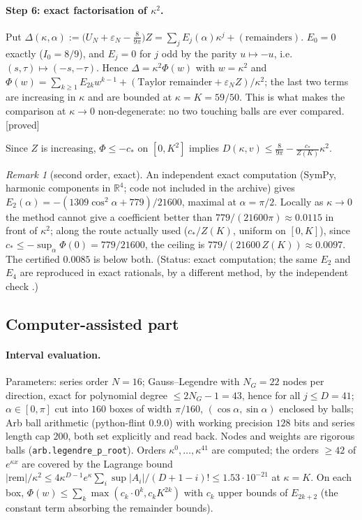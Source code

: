 \documentclass[11pt,a4paper]{article}
\theoremstyle{remark}
\newtheorem{remark}[theorem]{Remark}
\theoremstyle{definition}
\newcommand{\R}{\mathbb{R}}
\newcommand{\st}[1]{\textsf{[#1]}}
\begin{document}
\paragraph{Step 6: exact factorisation of $\kappa^2$.} Put
$\Delta(\kappa,\alpha):=\big(U_N+\varepsilon_N-\tfrac{8}{9\pi}\big)Z=\sum_jE_j(\alpha)\kappa^j+(\text{remainders})$.
$E_0=0$ exactly ($I_0=8/9$), and $E_j=0$ for $j$ odd by the parity $u\mapsto-u$, i.e.\ $(s,\tau)\mapsto(-s,-\tau)$.
Hence $\Delta=\kappa^2\Phi(w)$ with $w=\kappa^2$ and
$\Phi(w)=\sum_{k\ge1}E_{2k}w^{k-1}+(\text{Taylor remainder}+\varepsilon_NZ)/\kappa^2$; the last two terms
are increasing in $\kappa$ and are bounded at $\kappa=K=59/50$. This is what makes the comparison at
$\kappa\to0$ non-degenerate: no two touching balls are ever compared. \st{proved}

Since $Z$ is increasing, $\Phi\le-c_\ast$ on $[0,K^2]$ implies
$D(\kappa,v)\le\frac{8}{9\pi}-\frac{c_\ast}{Z(K)}\kappa^2$.

\begin{remark}[second order, exact]
An independent exact computation (SymPy, harmonic components in $\R^4$; code not included in the archive)
gives $E_2(\alpha)=-(1309\cos^2\alpha+779)/21600$, maximal at $\alpha=\pi/2$. Locally as $\kappa\to0$ the
method cannot give a coefficient better than $779/(21600\pi)\approx0.0115$ in front of $\kappa^2$; along the
route actually used ($c_\ast/Z(K)$, uniform on $[0,K]$), since $c_\ast\le-\sup_\alpha\Phi(0)=779/21600$, the
ceiling is $779/(21600\,Z(K))\approx0.0097$. The certified $0.0085$ is below both.
(Status: exact computation; the same $E_2$ and $E_4$ are reproduced in exact rationals, by a different method,
by the independent check .)
\end{remark}

\subsection{Computer-assisted part}\label{sec:cap}

\paragraph{Interval evaluation.} Parameters: series order $N=16$; Gauss--Legendre with $N_G=22$ nodes per
direction, exact for polynomial degree $\le2N_G-1=43$, hence for all $j\le D=41$; $\alpha\in[0,\pi]$ cut into
$160$ boxes of width $\pi/160$, $(\cos\alpha,\sin\alpha)$ enclosed by balls; Arb ball arithmetic
(python-flint 0.9.0) with working precision $128$ bits and series length cap $200$, both set explicitly and
read back. Nodes and weights are rigorous balls (\texttt{arb.legendre\_p\_root}). Orders $\kappa^0,\dots,\kappa^{41}$
are computed; the orders $\ge42$ of $e^{\kappa x}$ are covered by the Lagrange bound
$|\text{rem}|/\kappa^2\le4\kappa^{D-1}e^{\kappa}\sum_i\sup|A_i|/(D+1-i)!\le1.53\cdot10^{-21}$ at $\kappa=K$.
On each box, $\Phi(w)\le\sum_k\max(c_k\cdot0^k,c_kK^{2k})$ with $c_k$ upper bounds of $E_{2k+2}$ (the constant
term absorbing the remainder bounds).
\end{document}
